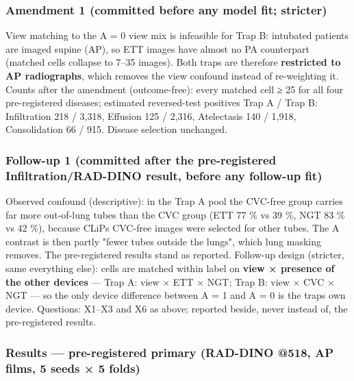 {\subsubsection{Amendment 1 (committed before any model fit; stricter)}\label{amendment-1-committed-before-any-model-fit-stricter}

View matching to the A = 0 view mix is infeasible for Trap B: intubated patients are imaged supine (AP), so
ETT images have almost no PA counterpart (matched cells collapse to 7--35 images). Both traps are therefore
\textbf{restricted to AP radiographs}, which removes the view confound instead of re-weighting it. Counts after the
amendment (outcome-free): every matched cell ≥ 25 for all four pre-registered diseases; estimated reversed-test
positives Trap A / Trap B: Infiltration 218 / 3,318, Effusion 125 / 2,316, Atelectasis 140 / 1,918,
Consolidation 66 / 915. Disease selection unchanged.

\subsubsection{Follow-up 1 (committed after the pre-registered Infiltration/RAD-DINO result, before any follow-up fit)}\label{follow-up-1-committed-after-the-pre-registered-infiltrationrad-dino-result-before-any-follow-up-fit}

Observed confound (descriptive): in the Trap A pool the CVC-free group carries far more out-of-lung tubes than the
CVC group (ETT 77 \% vs 39 \%, NGT 83 \% vs 42 \%), because CLiP\textquotesingle s CVC-free images were selected for other tubes. The
A contrast is then partly "fewer tubes outside the lungs", which lung masking removes. The pre-registered results
stand as reported. Follow-up design (stricter, same everything else): cells are matched within label on
\textbf{view × presence of the other devices} --- Trap A: view × ETT × NGT; Trap B: view × CVC × NGT --- so the only device
difference between A = 1 and A = 0 is the trap\textquotesingle s own device. Questions: X1--X3 and X6 as above; reported beside,
never instead of, the pre-registered results.

\subsubsection{Results --- pre-registered primary (RAD-DINO @518, AP films, 5 seeds × 5 folds)}\label{results--pre-registered-primary-rad-dino-518-ap-films-5-seeds--5-folds}

}
